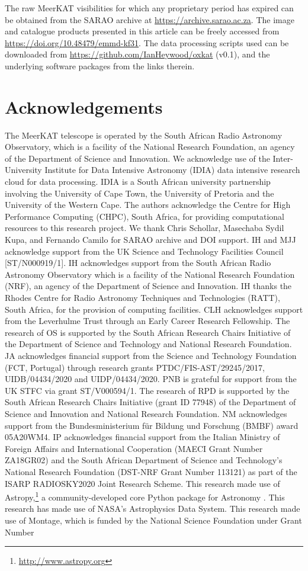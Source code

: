 \documentclass[usenatbib,usedcolumn]{mnras}
\begin{document}
The raw MeerKAT visibilities for which any proprietary period has expired can be obtained from the SARAO archive at \url{https://archive.sarao.ac.za}. The image and catalogue products presented in this article can be freely accessed from \url{https://doi.org/10.48479/emmd-kf31}. The data processing scripts used can be downloaded from \url{https://github.com/IanHeywood/oxkat} (v0.1), and the underlying software packages from the links therein.


\section*{Acknowledgements}

The MeerKAT telescope is operated by the South African Radio Astronomy Observatory, which is a facility of the National Research Foundation, an agency of the Department of Science and Innovation. We acknowledge use of the Inter-University Institute for Data Intensive Astronomy (IDIA) data intensive research cloud for data processing. IDIA is a South African university partnership involving the University of Cape Town, the University of Pretoria and the University of the Western Cape. The authors acknowledge the Centre for High Performance Computing (CHPC), South Africa, for providing computational resources to this research project. We thank Chris Schollar, Masechaba Sydil Kupa, and Fernando Camilo for SARAO archive and DOI support. IH and MJJ acknowledge support from the UK Science and Technology Facilities Council [ST/N000919/1]. IH acknowledges support from the South African Radio Astronomy Observatory which is a facility of the National Research Foundation (NRF), an agency of the Department of Science and Innovation. IH thanks the Rhodes Centre for Radio Astronomy Techniques and Technologies (RATT), South Africa, for the provision of computing facilities. CLH acknowledges support from the Leverhulme Trust through an Early Career Research Fellowship. The research of OS is supported by the South African Research Chairs Initiative of the Department of Science and Technology and National Research Foundation. JA acknowledges financial support from the Science and Technology Foundation (FCT, Portugal) through research grants PTDC/FIS-AST/29245/2017, UIDB/04434/2020 and UIDP/04434/2020. PNB is grateful for support from the UK STFC via grant ST/V000594/1. The research of RPD is supported by the South African Research Chairs Initiative (grant ID 77948) of the Department of Science and Innovation and National Research Foundation. NM acknowledges support from the Bundesministerium f{\"u}r Bildung und Forschung (BMBF) award 05A20WM4. IP acknowledges financial support from the Italian Ministry of Foreign Affairs and International Cooperation (MAECI Grant Number ZA18GR02) and the South African Department of Science and Technology's National Research Foundation (DST-NRF Grant Number 113121) as part of the ISARP RADIOSKY2020 Joint Research Scheme. This research made use of Astropy,\footnote{\url{http://www.astropy.org}} a community-developed core Python package for Astronomy \citep{astropy2013, astropy2018}. This research has made use of NASA's Astrophysics Data System. This research made use of Montage, which is funded by the National Science Foundation under Grant Number 
\end{document}
